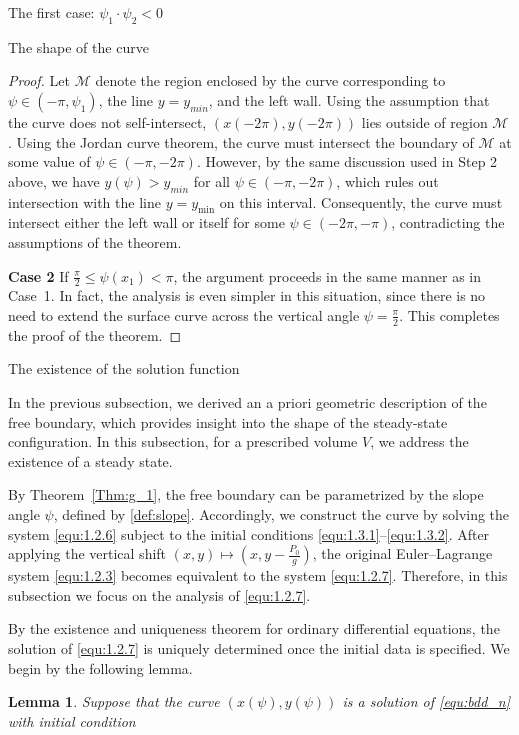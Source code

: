 \documentclass[letterpaper,reqno,10pt,twoside]{amsart}
\newtheorem{lemma}[theorem]{Lemma}
\theoremstyle{definition}
\theoremstyle{remark}
\begin{document}
\begin{section}{The first case: $\psi_1\cdot \psi_2<0$ }
\begin{subsection}{The shape of the curve}
\begin{proof}
       Let $\mathcal{M}$ denote the region enclosed by the curve corresponding to $\psi\in (-\pi,\psi_{1})$, the line $y=y_{min}$, and the left wall. Using the assumption that the curve does not self-intersect, $(x(-2\pi),y(-2\pi))$ lies outside of region $\mathcal{M}$. Using the Jordan curve theorem, the curve must intersect the boundary of $\mathcal{M}$ at some value of $\psi\in (-\pi,-2\pi)$. However, by the same discussion used in Step 2 above, we have $y(\psi)>y_{min}$ for all $\psi\in (-\pi,-2\pi)$, which rules out intersection with the line $y=y_{\min}$ on this interval. Consequently, the curve must intersect either the left wall or itself for some $\psi\in(-2\pi,-\pi)$, contradicting the assumptions of the theorem.
       

        \textbf{Case 2} If $\frac{\pi}{2}\le \psi(x_{1})<\pi$, the argument proceeds in the same manner as in Case~1. In fact, the analysis is even simpler in this situation, since there is no need to extend the surface curve across the vertical angle $\psi=\tfrac{\pi}{2}$. This completes the proof of the theorem.
    \end{proof}

    \end{subsection}

    \begin{subsection}{The existence of the solution function}

   In the previous subsection, we derived an a priori geometric description of the free boundary, which provides insight into the shape of the steady-state configuration. In this subsection, for a prescribed volume $V$, we address the existence of a steady state.
     
    By Theorem~\ref{Thm:g_1}, the free boundary can be parametrized by the slope angle $\psi$, defined by \eqref{def:slope}. Accordingly, we construct the curve by solving the system \eqref{equ:1.2.6} subject to the initial conditions \eqref{equ:1.3.1}–\eqref{equ:1.3.2}. After applying the vertical shift $(x,y)\mapsto (x,y-\tfrac{P_{0}}{g})$, the original Euler–Lagrange system \eqref{equ:1.2.3} becomes equivalent to the system \eqref{equ:1.2.7}. Therefore, in this subsection we focus on the analysis of \eqref{equ:1.2.7}.

By the existence and uniqueness theorem for ordinary differential equations, the solution of \eqref{equ:1.2.7} is uniquely determined once the initial data is specified. We begin by the following lemma.
    

    \begin{lemma}{\label{lem:curve}}
        Suppose that the curve $(x(\psi),y(\psi))$ is a solution of \eqref{equ:bdd_n} with initial condition


\end{lemma}
\end{subsection}
\end{section}
\end{document}
